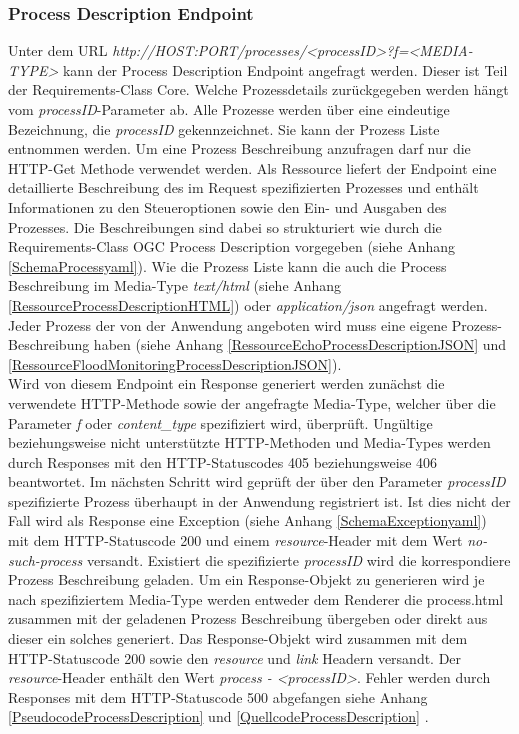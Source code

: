 \subsubsection{Process Description Endpoint}
Unter dem URL \textit{http://HOST:PORT/processes/<processID>?f=<MEDIA-TYPE>} kann der Process Description Endpoint angefragt werden. 
Dieser ist Teil der Requirements-Class Core. 
Welche Prozessdetails zurückgegeben werden hängt vom \textit{processID}-Parameter ab. Alle Prozesse werden über eine 
eindeutige Bezeichnung, die \textit{processID} gekennzeichnet. 
Sie kann der Prozess Liste entnommen werden. Um eine Prozess Beschreibung anzufragen darf nur die HTTP-Get Methode verwendet werden.   
Als Ressource liefert der Endpoint eine detaillierte Beschreibung des im Request spezifizierten Prozesses und enthält Informationen 
zu den Steueroptionen sowie den Ein- und Ausgaben des Prozesses.
Die Beschreibungen sind dabei so strukturiert wie durch die Requirements-Class OGC Process Description vorgegeben (siehe Anhang \ref{SchemaProcessyaml}). 
Wie die Prozess Liste kann die auch die Process Beschreibung im Media-Type \textit{text/html} (siehe Anhang \ref{RessourceProcessDescriptionHTML}) 
oder \textit{application/json} angefragt werden.
Jeder Prozess der von der Anwendung angeboten wird muss eine eigene Prozess-Beschreibung haben (siehe Anhang \ref{RessourceEchoProcessDescriptionJSON} und 
\ref{RessourceFloodMonitoringProcessDescriptionJSON}).\\

Wird von diesem Endpoint ein Response generiert werden zunächst die verwendete HTTP-Methode sowie der angefragte Media-Type, welcher über die 
Parameter \textit{f} oder \textit{content\_type} spezifiziert wird, überprüft. Ungültige beziehungsweise nicht unterstützte HTTP-Methoden 
und Media-Types werden durch Responses mit den HTTP-Statuscodes 405 beziehungsweise 406 beantwortet.  
Im nächsten Schritt wird geprüft der über den Parameter \textit{processID} spezifizierte Prozess überhaupt in der Anwendung registriert ist. 
Ist dies nicht der Fall wird als Response eine Exception (siehe Anhang \ref{SchemaExceptionyaml})
mit dem HTTP-Statuscode 200 und einem \textit{resource}-Header mit dem Wert \textit{no-such-process} versandt. 
Existiert die spezifizierte \textit{processID} wird die korrespondiere Prozess Beschreibung geladen. Um ein Response-Objekt zu generieren 
wird je nach spezifiziertem Media-Type werden entweder dem Renderer die process.html zusammen mit der geladenen Prozess Beschreibung übergeben oder 
direkt aus dieser ein solches generiert. 
Das Response-Objekt wird zusammen mit dem HTTP-Statuscode 200 sowie den \textit{resource} und \textit{link} Headern versandt. 
Der \textit{resource}-Header enthält den Wert \textit{process - <processID>}. Fehler werden durch Responses mit dem HTTP-Statuscode 500 
abgefangen siehe Anhang \ref{PseudocodeProcessDescription} und \ref{QuellcodeProcessDescription} \cite{ogc_api_processes_core}.

